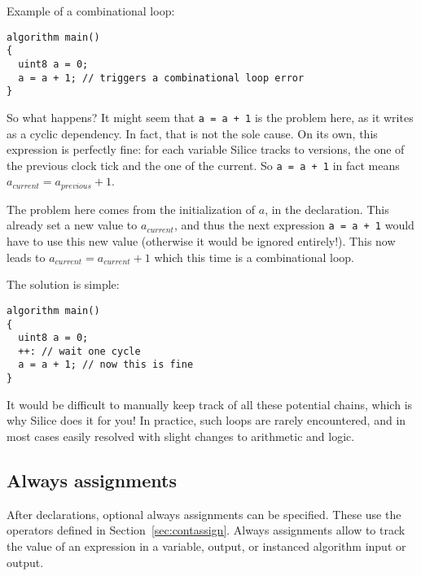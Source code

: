\documentclass[a4]{article}
\newcommand\silice{Silice}
\begin{document}
\vspace*{2mm}
\noindent Example of a combinational loop:
\begin{verbatim}
algorithm main()
{
  uint8 a = 0;
  a = a + 1; // triggers a combinational loop error
}
\end{verbatim}

So what happens? It might seem that \texttt{a = a + 1} is the problem here, as it writes as a cyclic dependency. In fact, that is not the sole cause. On its own, this expression is perfectly fine: for each variable \silice{} tracks to versions, the one of the previous clock tick and the one of the current. So \texttt{a = a + 1} in fact means $a_{current} = a_{previous} + 1$.

The problem here comes from the initialization of $a$, in the declaration. This already set a new value to $a_{current}$, and thus the next expression \texttt{a = a + 1} would have to use this new value (otherwise it would be ignored entirely!). This now leads to $a_{current} = a_{current} + 1$ which this time is a combinational loop.

\vspace*{2mm}
\noindent The solution is simple:
\begin{verbatim}
algorithm main()
{
  uint8 a = 0;
  ++: // wait one cycle
  a = a + 1; // now this is fine
}
\end{verbatim}

It would be difficult to manually keep track of all these potential chains, which is why \silice{} does it for you! In practice, such loops are rarely encountered, and in most cases easily resolved with slight changes to arithmetic and logic.

\vspace*{5mm}
\noindent
{}


\subsection{Always assignments}

After declarations, optional always assignments can be specified.
These use the operators defined in Section~\ref{sec:contassign}.
%
Always assignments allow to track the value of an expression
in a variable, output, or instanced algorithm input or output.
\end{document}
